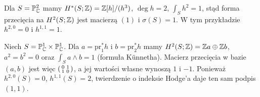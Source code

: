 \begin{przyklad}
Dla $S=\mathbb P^2_{\mathbb{C}}$ mamy
$H^*(S;\mathbb{Z})=\mathbb{Z}[h]/(h^3)$, $\deg h=2$,
$\int_S h^2=1$, stąd forma przecięcia na
$H^2(S;\mathbb{Z})$ jest macierzą $(1)$ i $\sigma(S)=1$.
W tym przykładzie $h^{2,0}=0$ i $h^{1,1}=1$.
\end{przyklad}

\begin{przyklad}
Niech $S=\mathbb P^1_{\mathbb{C}}\times\mathbb P^1_{\mathbb{C}}$.
Dla $a=\mathrm{pr}_1^*h$ i $b=\mathrm{pr}_2^*h$ mamy
$H^2(S;\mathbb{Z})=\mathbb{Z} a\oplus\mathbb{Z} b$, $a^2=b^2=0$ oraz
$\int_S a\wedge b=1$ (formuła Künnetha).
Macierz przecięcia w bazie $(a,b)$ jest więc
$\begin{psmallmatrix}0&1\\1&0\end{psmallmatrix}$,
a jej wartości własne wynoszą $1$ i $-1$.
Ponieważ $h^{2,0}(S)=0$, $h^{1,1}(S)=2$,
twierdzenie o indeksie Hodge'a daje ten sam podpis $(1,1)$.
\end{przyklad}

